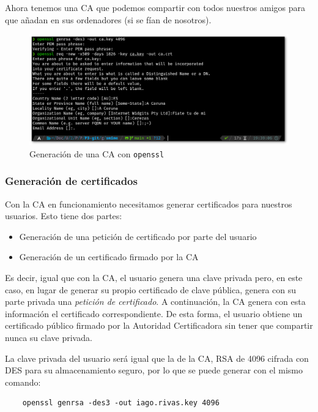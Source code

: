 Ahora tenemos una CA que podemos compartir con todos nuestros amigos para que añadan en sus ordenadores (si se fían de nosotros).

\begin{figure}[H]
    \centering
    \includegraphics[width=\textwidth]{openssl-ca-sombra.png}
    \caption{Generación de una CA con \texttt{openssl}}
\end{figure}

\subsubsection{Generación de certificados}

Con la CA en funcionamiento necesitamos generar certificados para nuestros usuarios. Esto tiene dos partes:

\begin{itemize}
    \item Generación de una petición de certificado por parte del usuario
    \item Generación de un certificado firmado por la CA
\end{itemize}

Es decir, igual que con la CA, el usuario genera una clave privada pero, en este caso, en lugar de generar su propio certificado de clave pública, genera con su parte privada una \textit{petición de certificado}. A continuación, la CA genera con esta información el certificado correspondiente. De esta forma, el usuario obtiene un certificado público firmado por la Autoridad Certificadora sin tener que compartir nunca su clave privada.

La clave privada del usuario será igual que la de la CA, RSA de 4096 cifrada con DES para su almacenamiento seguro, por lo que se puede generar con el mismo comando:

\begin{verbatim}
    openssl genrsa -des3 -out iago.rivas.key 4096
\end{verbatim}


